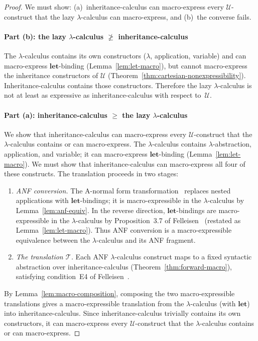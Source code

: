 \begin{proof}
  We must show:
  (a)~inheritance-calculus can macro-express every
  $\mathscr{U}$-construct that the lazy $\lambda$-calculus
  can macro-express, and
  (b)~the converse fails.

  \paragraph{Part (b): the lazy $\lambda$-calculus $\not\geq$
  inheritance-calculus}
  The $\lambda$-calculus contains its own constructors
  ($\lambda$, application, variable) and can macro-express
  $\mathbf{let}$-binding (Lemma~\ref{lem:let-macro}), but
  cannot macro-express the inheritance constructors of
  $\mathscr{U}$
  (Theorem~\ref{thm:cartesian-nonexpressibility}).
  Inheritance-calculus contains those constructors.
  Therefore the lazy $\lambda$-calculus is not at least
  as expressive as inheritance-calculus with respect
  to~$\mathscr{U}$.

  \paragraph{Part (a): inheritance-calculus $\geq$ the lazy
  $\lambda$-calculus}
  We show that inheritance-calculus can macro-express
  every $\mathscr{U}$-construct that the
  $\lambda$-calculus contains or can macro-express.
  The $\lambda$-calculus contains $\lambda$-abstraction,
  application, and variable; it can macro-express
  $\mathbf{let}$-binding
  (Lemma~\ref{lem:let-macro}).
  We must show that inheritance-calculus can
  macro-express all four of these constructs.
  The translation proceeds in two stages:
  \begin{enumerate}
    \item \emph{ANF conversion.}
      The A-normal form
      transformation~\cite{flanagan1993-essence-compiling-continuations}
      replaces nested applications with
      $\mathbf{let}$-bindings; it is macro-expressible
      in the $\lambda$-calculus by
      Lemma~\ref{lem:anf-equiv}.
      In the reverse direction,
      $\mathbf{let}$-bindings are macro-expressible in
      the $\lambda$-calculus by
      Proposition~3.7 of
      Felleisen~\cite{felleisen1991-expressive-power}
      (restated as Lemma~\ref{lem:let-macro}).
      Thus ANF conversion is a macro-expressible
      equivalence between the $\lambda$-calculus and its
      ANF fragment.
    \item \emph{The translation $\mathcal{T}$.}
      Each ANF $\lambda$-calculus construct maps to a
      fixed syntactic abstraction over
      inheritance-calculus
      (Theorem~\ref{thm:forward-macro}), satisfying
      condition~E4 of
      Felleisen~\cite[Definition~3.11]{felleisen1991-expressive-power}.
  \end{enumerate}
  By Lemma~\ref{lem:macro-composition}, composing the
  two macro-expressible translations gives a
  macro-expressible translation from
  the $\lambda$-calculus (with $\mathbf{let}$) into
  inheritance-calculus.
  Since inheritance-calculus trivially contains its own
  constructors, it can macro-express every
  $\mathscr{U}$-construct that the $\lambda$-calculus
  contains or can macro-express.
\end{proof}

